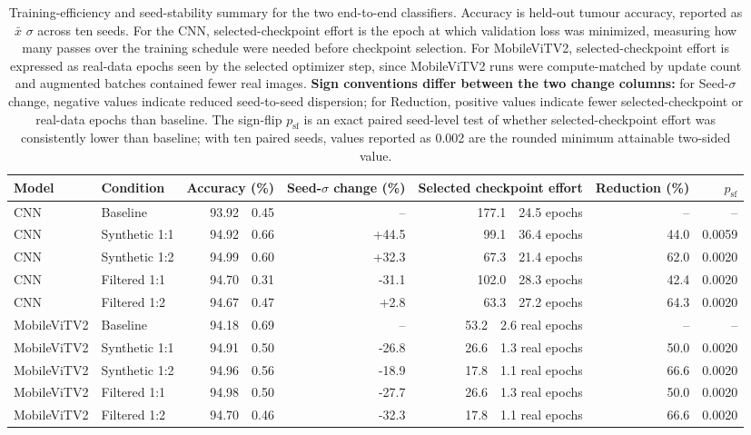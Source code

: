 \documentclass[conference,twoside]{IEEEtran}
\newcommand{\figfont}{\sffamily}
\DeclareRobustCommand{\plotmathversion}{}
\DeclareRobustCommand{\plotmathversion}{\mathversion{plotsans}}
\newcommand{\floatcaprule}{}
\newcommand{\plotfigurefont}{\figfont\plotmathversion}
\newcommand{\metriccell}[2]{#1~\textpm{}~#2}
\begin{document}
\begin{table}[!tbp]
  \floatcaprule
\caption{Training-efficiency and seed-stability summary for the two end-to-end classifiers. Accuracy is held-out tumour accuracy, reported as $\bar{x}$ \textpm{} $\sigma$ across ten seeds. For the CNN, selected-checkpoint effort is the epoch at which validation loss was minimized, measuring how many passes over the training schedule were needed before checkpoint selection. For MobileViTV2, selected-checkpoint effort is expressed as real-data epochs seen by the selected optimizer step, since MobileViTV2 runs were compute-matched by update count and augmented batches contained fewer real images. \textbf{Sign conventions differ between the two change columns:} for Seed-$\sigma$ change, negative values indicate reduced seed-to-seed dispersion; for Reduction, positive values indicate fewer selected-checkpoint or real-data epochs than baseline. The sign-flip $p_{\mathrm{sf}}$ is an exact paired seed-level test of whether selected-checkpoint effort was consistently lower than baseline; with ten paired seeds, values reported as 0.002 are the rounded minimum attainable two-sided value.}
\label{tab:efficiency-stability}
\centering
\normalfont\plotfigurefont\scriptsize
\begin{tabularx}{\textwidth}{YYrrrrr}
\toprule
Model & Condition & Accuracy (\%) & Seed-$\sigma$ change (\%) & Selected checkpoint effort & Reduction (\%) & $p_{\mathrm{sf}}$ \\
\midrule
CNN & Baseline & \metriccell{93.92}{0.45} & -- & \metriccell{177.1}{24.5} epochs & -- & -- \\
CNN & Synthetic 1:1 & \metriccell{94.92}{0.66} & +44.5 & \metriccell{99.1}{36.4} epochs & 44.0 & 0.0059 \\
CNN & Synthetic 1:2 & \metriccell{94.99}{0.60} & +32.3 & \metriccell{67.3}{21.4} epochs & 62.0 & 0.0020 \\
CNN & Filtered 1:1 & \metriccell{94.70}{0.31} & -31.1 & \metriccell{102.0}{28.3} epochs & 42.4 & 0.0020 \\
CNN & Filtered 1:2 & \metriccell{94.67}{0.47} & +2.8 & \metriccell{63.3}{27.2} epochs & 64.3 & 0.0020 \\
\midrule
MobileViTV2 & Baseline & \metriccell{94.18}{0.69} & -- & \metriccell{53.2}{2.6} real epochs & -- & -- \\
MobileViTV2 & Synthetic 1:1 & \metriccell{94.91}{0.50} & -26.8 & \metriccell{26.6}{1.3} real epochs & 50.0 & 0.0020 \\
MobileViTV2 & Synthetic 1:2 & \metriccell{94.96}{0.56} & -18.9 & \metriccell{17.8}{1.1} real epochs & 66.6 & 0.0020 \\
MobileViTV2 & Filtered 1:1 & \metriccell{94.98}{0.50} & -27.7 & \metriccell{26.6}{1.3} real epochs & 50.0 & 0.0020 \\
MobileViTV2 & Filtered 1:2 & \metriccell{94.70}{0.46} & -32.3 & \metriccell{17.8}{1.1} real epochs & 66.6 & 0.0020 \\
\bottomrule
\end{tabularx}
\end{table}
\end{document}
